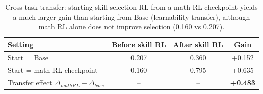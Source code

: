 
\begin{table}[t]
  \centering
  \caption{Cross-task transfer: starting skill-selection RL from a math-RL checkpoint yields a much larger gain than starting from Base (learnability transfer), although math RL alone does not improve selection (0.160 vs 0.207).}
  \label{tab:transfer}
  \begin{tabular}{lccc}
    \toprule
    Setting & Before skill RL & After skill RL & Gain \\
    \midrule
    Start = Base & 0.207 & 0.360 & +0.152 \\
    Start = math-RL checkpoint & 0.160 & 0.795 & +0.635 \\
    Transfer effect $\Delta_{mathRL}-\Delta_{base}$ & -- & -- & \textbf{+0.483} \\
    \bottomrule
  \end{tabular}
\end{table}
